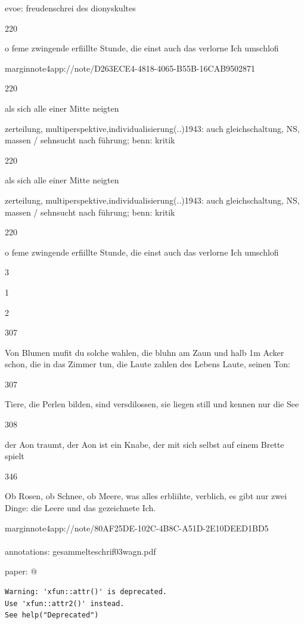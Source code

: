\documentclass[
  letterpaper,
  DIV=11,
  numbers=noendperiod]{scrartcl}
\makeatletter
\let\oldparagraph\paragraph
\renewcommand{\paragraph}{
    \@ifstar
      \xxxParagraphStar
      \xxxParagraphNoStar
  }
\newcommand{\xxxParagraphStar}[1]{\oldparagraph*{#1}\mbox{}}
\newcommand{\xxxParagraphNoStar}[1]{\oldparagraph{#1}\mbox{}}
\makeatother
\begin{document}
evoe: freudenschrei des dionyskultes

220

o feme zwingende erfiillte Stunde, die einst auch das verlorne Ich
umschlofi

marginnote4app://note/D263ECE4-4818-4065-B55B-16CAB9502871

220

als sich alle einer Mitte neigten

zerteilung, multiperspektive,individualisierung(..)1943: auch
gleichschaltung, NS, massen / sehnsucht nach führung; benn: kritik

220

als sich alle einer Mitte neigten

zerteilung, multiperspektive,individualisierung(..)1943: auch
gleichschaltung, NS, massen / sehnsucht nach führung; benn: kritik

220

o feme zwingende erfiillte Stunde, die einst auch das verlorne Ich
umschlofi

3

1

2

307

Von Blumen mufit du solche wahlen, die bluhn am Zaun und halb 1m Acker
schon, die in das Zimmer tun, die Laute zahlen des Lebens Laute, seinen
Ton:

307

Tiere, die Perlen bilden, sind versdilossen, sie liegen still und kennen
nur die See

308

der Aon traumt, der Aon ist ein Knabe, der mit sich selbst auf einem
Brette spielt

346

Ob Rosen, ob Schnee, ob Meere, was alles erbliihte, verblich, es gibt
nur zwei Dinge: die Leere und das gezeichnete Ich.

marginnote4app://note/80AF25DE-102C-4B8C-A51D-2E10DEED1BD5

\paragraph{annotations:
gesammelteschrif03wagn.pdf}\label{annotations-gesammelteschrif03wagn.pdf}

paper: @

\begin{verbatim}
Warning: 'xfun::attr()' is deprecated.
Use 'xfun::attr2()' instead.
See help("Deprecated")
\end{verbatim}
\end{document}
